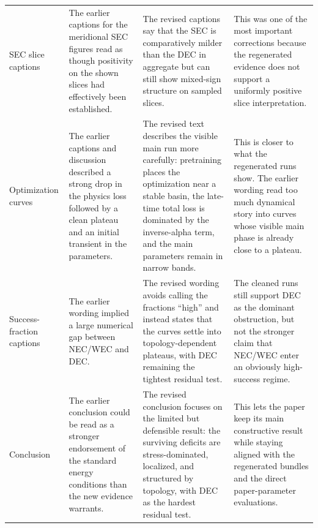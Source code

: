 \documentclass[11pt]{article}
\begin{document}
\begin{longtable}{p{} p{} p{} p{}}
SEC slice captions &
The earlier captions for the meridional SEC figures read as though positivity on the shown slices
had effectively been established. &
The revised captions say that the SEC is comparatively milder than the DEC in aggregate but
can still show mixed-sign structure on sampled slices. &
This was one of the most important corrections because the regenerated evidence does not support a
uniformly positive slice interpretation. \\[0.2cm]

Optimization curves &
The earlier captions and discussion described a strong drop in the physics loss followed by a clean
plateau and an initial transient in the parameters. &
The revised text describes the visible main run more carefully: pretraining places the optimization
near a stable basin, the late-time total loss is dominated by the inverse-alpha term, and the
main parameters remain in narrow bands. &
This is closer to what the regenerated runs show. The earlier wording read too much dynamical
story into curves whose visible main phase is already close to a plateau. \\[0.2cm]

Success-fraction captions &
The earlier wording implied a large numerical gap between NEC/WEC and DEC. &
The revised wording avoids calling the fractions ``high'' and instead states that the curves settle
into topology-dependent plateaus, with DEC remaining the tightest residual test. &
The cleaned runs still support DEC as the dominant obstruction, but not the stronger claim that
NEC/WEC enter an obviously high-success regime. \\[0.2cm]

Conclusion &
The earlier conclusion could be read as a stronger endorsement of the standard energy conditions
than the new evidence warrants. &
The revised conclusion focuses on the limited but defensible result: the surviving deficits are
stress-dominated, localized, and structured by topology, with DEC as the hardest residual test. &
This lets the paper keep its main constructive result while staying aligned with the regenerated
bundles and the direct paper-parameter evaluations. \\

\end{longtable}
\end{document}
